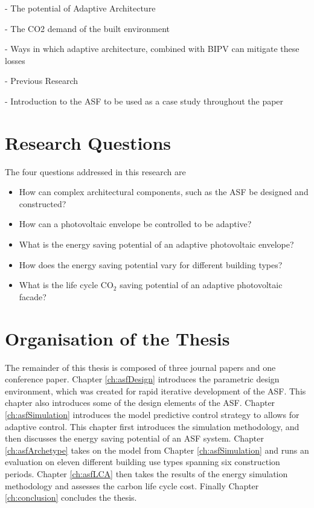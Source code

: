 - The potential of Adaptive Architecture

- The CO2 demand of the built environment

- Ways in which adaptive architecture, combined with BIPV can mitigate these losses

- Previous Research 

- Introduction to the ASF to be used as a case study throughout the paper


\section{Research Questions}

The four questions addressed in this research are 

\begin{itemize}
\item How can complex architectural components, such as the ASF be designed and constructed? 
\item How can a photovoltaic envelope be controlled to be adaptive?
\item What is the energy saving potential of an adaptive photovoltaic envelope?
\item How does the energy saving potential vary for different building types?
\item What is the life cycle CO$_2$ saving potential of an adaptive photovoltaic facade?

\end{itemize}

\section{Organisation of the Thesis}

The remainder of this thesis is composed of three journal papers and one conference paper. Chapter \ref{ch:asfDesign} introduces the parametric design environment, which was created for rapid iterative development of the ASF. This chapter also introduces some of the design elements of the ASF. Chapter \ref{ch:asfSimulation} introduces the model predictive control strategy to allows for adaptive control. This chapter first introduces the simulation methodology, and then discusses the energy saving potential of an ASF system. Chapter \ref{ch:asfArchetype} takes on the model from Chapter \ref{ch:asfSimulation} and runs an evaluation on eleven different building use types spanning six construction periods. Chapter \ref{ch:asfLCA} then takes the results of the energy simulation methodology and assesses the carbon life cycle cost. Finally Chapter \ref{ch:conclusion} concludes the thesis. 